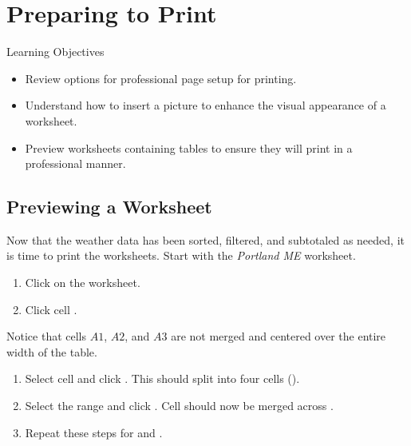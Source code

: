 \section{Preparing to Print}

\begin{center}
	\begin{objbox}{Learning Objectives}
		\begin{itemize}
			\setlength{\itemsep}{0pt}
			\setlength{\parskip}{0pt}
			\setlength{\parsep}{0pt}

			\item Review options for professional page setup for printing.
			\item Understand how to insert a picture to enhance the visual appearance of a worksheet.
			\item Preview worksheets containing tables to ensure they will print in a professional manner.
			
		\end{itemize}
	\end{objbox}
\end{center}

\subsection{Previewing a Worksheet}

Now that the weather data has been sorted, filtered, and subtotaled as needed, it is time to print the worksheets. Start with the \textit{Portland ME} worksheet.

\begin{enumbox}
	\begin{enumerate}
		\item Click on the  worksheet. 
		\item Click cell .
	\end{enumerate}
\end{enumbox}

Notice that cells $ A1 $, $ A2 $, and $ A3 $ are not merged and centered over the entire width of the table. 

\begin{enumbox}
	\begin{enumerate}
		\item Select cell  and click . This should split  into four cells ().
		\item Select the range  and click . Cell  should now be merged across .
		\item Repeat these steps for  and .
	\end{enumerate}
\end{enumbox}

